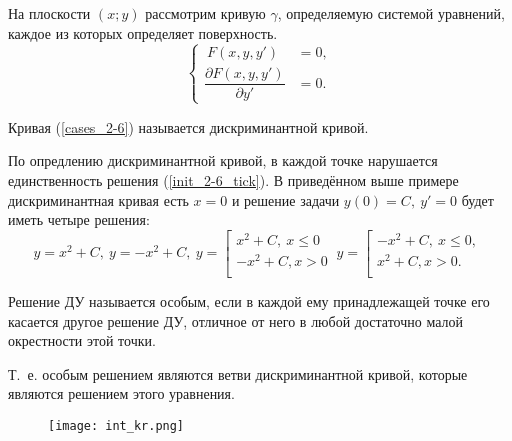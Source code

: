 На плоскости $(x; y)$ рассмотрим кривую $\gamma$, определяемую системой уравнений, каждое из которых определяет поверхность.
\begin{equation}\label{cases_2-6}
	\begin{cases}
		\ F(x, y, y') & = 0, \\
		\dfrac{\partial F(x, y, y')}{\partial y'} & = 0.
	\end{cases}
\end{equation}
\begin{definition}
	Кривая (\ref{cases_2-6}) называется дискриминантной кривой.
\end{definition}
\begin{remark}
	По опредлению дискриминантной кривой, в каждой точке нарушается единственность решения (\ref{init_2-6_tick}). В приведённом выше примере дискриминантная кривая есть $x = 0$ и решение задачи $y(0) = C,\ y' = 0$ будет иметь четыре решения:
	\begin{equation*}
		y = x^2 + C,\ y = -x^2 + C,\ 
		y = 
		\left[ 
			\begin{gathered} 
				x^2 + C,\ x \leq 0\\
				-x^2 + C, x > 0\\ 
			\end{gathered} 
		\right.\
		y = 
		\left[ 
			\begin{gathered} 
				-x^2 + C,\ x \leq 0,\\
				x^2 + C, x > 0.\\ 
			\end{gathered} 
		\right.\
	\end{equation*}
\end{remark}
\begin{definition}
	Решение ДУ называется особым, если в каждой ему принадлежащей точке его касается другое решение ДУ, отличное от него в любой достаточно малой окрестности этой точки.
\end{definition}
\begin{remark}
	Т.\ е. особым решением являются ветви дискриминантной кривой, которые являются решением этого уравнения.
	
	\begin{figure}
	    \centering
	    \texttt{[image: int\_kr.png]}
	\end{figure}
\end{remark}

